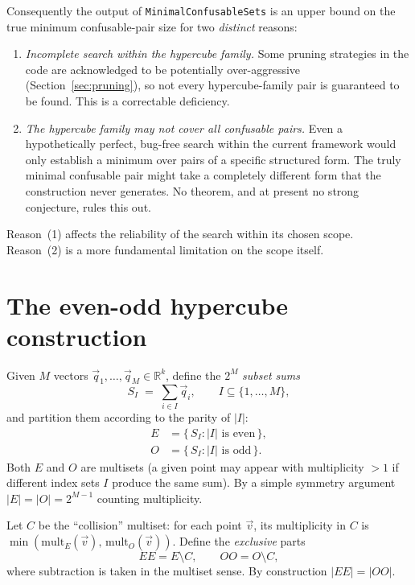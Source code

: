 \documentclass[12pt,a4paper]{article}
\begin{document}
Consequently the output of \texttt{MinimalConfusableSets} is an upper bound on
the true minimum confusable-pair size for two \emph{distinct} reasons:
\begin{enumerate}
  \item \emph{Incomplete search within the hypercube family.}  Some pruning
    strategies in the code are acknowledged to be potentially over-aggressive
    (Section~\ref{sec:pruning}), so not every hypercube-family pair is
    guaranteed to be found.  This is a correctable deficiency.
  \item \emph{The hypercube family may not cover all confusable pairs.}  Even
    a hypothetically perfect, bug-free search within the current framework
    would only establish a minimum over pairs of a specific structured form.
    The truly minimal confusable pair might take a completely different form
    that the construction never generates.  No theorem, and at present no
    strong conjecture, rules this out.
\end{enumerate}
Reason~(1) affects the reliability of the search within its chosen scope.
Reason~(2) is a more fundamental limitation on the scope itself.

\section{The even-odd hypercube construction}
\label{sec:even-odd}

Given $M$ vectors $\vec{q}_1, \ldots, \vec{q}_M \in \mathbb{R}^k$, define the
$2^M$ \emph{subset sums}
\[
  S_I \;=\; \sum_{i \in I} \vec{q}_i, \qquad I \subseteq \{1, \ldots, M\},
\]
and partition them according to the parity of $|I|$:
\begin{align*}
  E &= \{\, S_I : |I| \text{ is even}\,\},\\
  O &= \{\, S_I : |I| \text{ is odd}\,\}.
\end{align*}
Both $E$ and $O$ are multisets (a given point may appear with multiplicity $>1$
if different index sets $I$ produce the same sum). By a simple symmetry argument
$|E| = |O| = 2^{M-1}$ counting multiplicity.

Let $C$ be the ``collision'' multiset: for each point $\vec{v}$, its
multiplicity in $C$ is $\min(\text{mult}_{E}(\vec{v}),\,
\text{mult}_{O}(\vec{v}))$. Define the \emph{exclusive} parts
\[
  EE = E \setminus C, \qquad OO = O \setminus C,
\]
where subtraction is taken in the multiset sense. By construction
$|EE| = |OO|$.
\end{document}
